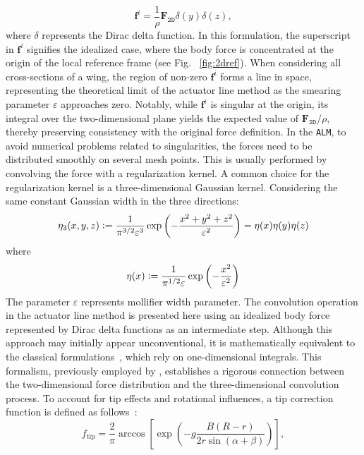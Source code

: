 \documentclass[11pt,a4paper]{article}
\newcommand{\defeq}{\vcentcolon=}
\begin{document}
%
\begin{equation}
\label{eq:f2d}
\boldsymbol{f}^i = \frac{1}{\rho} \boldsymbol{\text{F}}_{\texttt{2D}} \delta(y) \delta(z),
\end{equation}
%
where $\delta$ represents the Dirac delta function. In this formulation, the superscript in $\boldsymbol{f}^i$ signifies the idealized case, where the body force is concentrated at the origin of the local reference frame (see Fig. ~\ref{fig:2dref}). 
%
When considering all cross-sections of a wing, the region of non-zero $\boldsymbol{f}^i$ forms a line in space, representing the theoretical limit of the actuator line method as the smearing parameter $\varepsilon$ approaches zero. Notably, while $\boldsymbol{f}^i$ is singular at the origin, its integral over the two-dimensional plane yields the expected value of $\boldsymbol{\text{F}}_{\texttt{2D}}/\rho$, thereby preserving consistency with the original force definition.
%
In the \texttt{ALM}, to avoid numerical problems related to singularities, the forces need to be distributed smoothly on several mesh points. This is usually performed by convolving the force with a regularization kernel. A common choice for the regularization kernel is a three-dimensional Gaussian kernel.  Considering the same constant Gaussian width in the three directions:
\begin{equation}
\label{eq:eta3d}
\eta_3(x,y,z) \defeq \frac{1}{\pi^{3/2}\varepsilon^3} \exp{\left(-\frac{x^2+y^2+z^2}{\varepsilon^2}\right)}=\eta(x)\eta(y)\eta(z)
\end{equation}
where
\begin{equation}
\eta(x) \defeq \frac{1}{\pi^{1/2}\varepsilon} \exp{\left(-\frac{x^2}{\varepsilon^2}\right)}
\end{equation}
The parameter $\varepsilon$ represents mollifier width parameter.
%
The convolution operation in the actuator line method is presented here using an idealized body force represented by Dirac delta functions as an intermediate step. Although this approach may initially appear unconventional, it is mathematically equivalent to the classical formulations~\citep{sorensen2002numerical, mikkelsen2003actuator}, which rely on one-dimensional integrals. This formalism, previously employed by \cite{martinez2019filtered}, establishes a rigorous connection between the two-dimensional force distribution and the three-dimensional convolution process.
%
To account for tip effects and rotational influences, a tip correction function is defined as follows~\citep{shen2012actuator}:
\[
f_{\text{tip}} = \frac{2}{\pi} \arccos \left[\exp \left(-g \frac{B(R-r)}{2 r \sin (\alpha+\beta)}\right)\right],
\]
\end{document}
